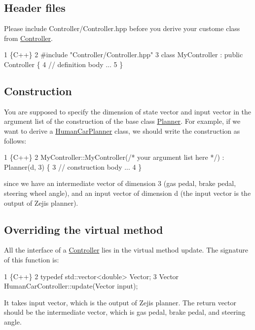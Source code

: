 \subsection*{Header files}

Please include {\ttfamily Controller/\+Controller.\+hpp} before you derive your custome class from {\ttfamily \hyperlink{classController}{Controller}}. 
\begin{DoxyCode}
1 \{C++\}
2 #include "Controller/Controller.hpp"
3 class MyController : public Controller \{
4     // definition body ...
5 \}
\end{DoxyCode}


\subsection*{Construction}

You are supposed to specify the dimension of {\ttfamily state} vector and {\ttfamily input} vector in the argument list of the construction of the base class {\ttfamily \hyperlink{classPlanner}{Planner}}. For example, if we want to derive a {\ttfamily \hyperlink{classHumanCarPlanner}{Human\+Car\+Planner}} class, we should write the construction as follows\+: 
\begin{DoxyCode}
1 \{C++\}
2 MyController::MyController(/* your argument list here */) : Planner(d, 3) \{
3     // construction body ...
4 \}
\end{DoxyCode}
 since we have an intermediate vector of dimension 3 (gas pedal, brake pedal, steering wheel angle), and an input vector of dimension d (the {\ttfamily input} vector is the output of Zeji\textquotesingle{}s planner).

\subsection*{Overriding the virtual method}

All the interface of a {\ttfamily \hyperlink{classController}{Controller}} lies in the virtual method {\ttfamily update}. The signature of this function is\+: 
\begin{DoxyCode}
1 \{C++\}
2 typedef std::vector<double> Vector;
3 Vector HumanCarController::update(Vector input);
\end{DoxyCode}


It takes {\ttfamily input} vector, which is the output of Zeji\textquotesingle{}s planner. The return vector should be the intermediate vector, which is gas pedal, brake pedal, and steering angle.

